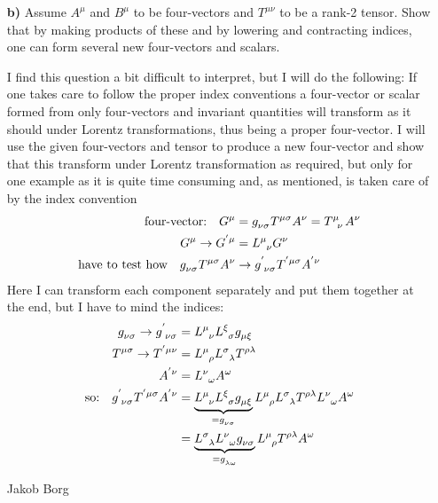 \documentclass[11pt,a4paper]{report}
\newcounter{excount}[chapter]
\newenvironment{exercise}[1][]{\addtocounter{excount}{1} \noindent {\bf Problem
    \arabic{excount} \ \ #1}\hspace{2mm}}{\vspace{4mm}}
\newenvironment{solution}[1][]
    {\begin{tcolorbox}[title=Solution #1,halign lower=right,breakable]
    }
    {
    \tcblower Jakob Borg
    \end{tcolorbox}
	\vspace{5mm}
    }
\begin{document}
\begin{exercise}
\begin{itemize}
\item[\bf b)] Assume $A^\mu$ and $B^\mu$  to be four-vectors and $T^{\mu\nu}$ to be a rank-2 tensor. Show that by making products of these and by lowering and contracting indices, one can form several new four-vectors and scalars.
\begin{solution}[\bf 1.b]
I find this question a bit difficult to interpret, but I will do the following: If one takes care to follow the proper index conventions a four-vector or scalar formed from only four-vectors and invariant quantities will transform as it should under Lorentz transformations, thus being a proper four-vector.
I will use the given four-vectors and tensor to produce a new four-vector and show that this transform under Lorentz transformation as required, but only for one example as it is quite time consuming and, as mentioned, is taken care of by the index convention
\begin{align*}
\qq*{four-vector:} G^\mu &= g\indices{_\nu_\sigma}T\indices{^\mu^\sigma}A^\nu = T\indices{^\mu_\nu} A^\nu %
\\
G^\mu \rightarrow G\indices{^'^\mu} &= L\indices{^\mu_\nu}G^\nu %
\\
\qq*{have to test how} g\indices{_\nu_\sigma}T\indices{^\mu^\sigma}A^\nu &\rightarrow g\indices{^'_\nu_\sigma}T\indices{^'^\mu^\sigma}A\indices{^'^\nu}
\end{align*}
Here I can transform each component separately and put them together at the end, but I have to mind the indices:
\begin{align*}
g\indices{_\nu_\sigma} \rightarrow g\indices{^'_\nu_\sigma} &= L\indices{^\mu_\nu}L\indices{^\xi_\sigma} g\indices{_\mu_\xi}
\\
T\indices{^\mu^\sigma} \rightarrow T\indices{^'^\mu^\nu}&= L\indices{^\mu_\rho}L\indices{^\sigma_\lambda}T\indices{^\rho^\lambda}
\\
A\indices{^'^\nu} &= L\indices{^\nu_\omega}A^\omega
\\
\qq*{so:} g\indices{^'_\nu_\sigma}T\indices{^'^\mu^\sigma}A\indices{^'^\nu} &= \underbrace{L\indices{^\mu_\nu}L\indices{^\xi_\sigma} g\indices{_\mu_\xi}}_{=g\indices{_\nu_\sigma}} L\indices{^\mu_\rho}L\indices{^\sigma_\lambda}T\indices{^\rho^\lambda}L\indices{^\nu_\omega}A^\omega
\\
&= \underbrace{L\indices{^\sigma_\lambda}L\indices{^\nu_\omega}g\indices{_\nu_\sigma}}_{=g\indices{_\lambda_\omega}} L\indices{^\mu_\rho}T\indices{^\rho^\lambda}A^\omega

\end{align*}
\end{solution}
\end{itemize}
\end{exercise}
\end{document}
